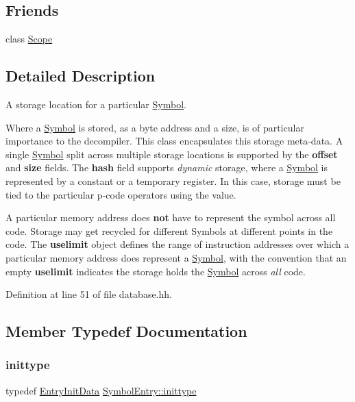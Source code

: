 \subsection*{Friends}
\begin{DoxyCompactItemize}
\item 
class \mbox{\hyperlink{class_symbol_entry_a921193447f6e42f596ac0a7694b02830}{Scope}}
\end{DoxyCompactItemize}


\subsection{Detailed Description}
A storage location for a particular \mbox{\hyperlink{class_symbol}{Symbol}}. 

Where a \mbox{\hyperlink{class_symbol}{Symbol}} is stored, as a byte address and a size, is of particular importance to the decompiler. This class encapsulates this storage meta-\/data. A single \mbox{\hyperlink{class_symbol}{Symbol}} split across multiple storage locations is supported by the {\bfseries{offset}} and {\bfseries{size}} fields. The {\bfseries{hash}} field supports {\itshape dynamic} storage, where a \mbox{\hyperlink{class_symbol}{Symbol}} is represented by a constant or a temporary register. In this case, storage must be tied to the particular p-\/code operators using the value.

A particular memory address does {\bfseries{not}} have to represent the symbol across all code. Storage may get recycled for different Symbols at different points in the code. The {\bfseries{uselimit}} object defines the range of instruction addresses over which a particular memory address does represent a \mbox{\hyperlink{class_symbol}{Symbol}}, with the convention that an empty {\bfseries{uselimit}} indicates the storage holds the \mbox{\hyperlink{class_symbol}{Symbol}} across {\itshape all} code. 

Definition at line 51 of file database.\+hh.



\subsection{Member Typedef Documentation}
\mbox{\label{class_symbol_entry_adca9545cc0e46b574a9cf9fbb44cfca8}} 
\subsubsection{\texorpdfstring{inittype}{inittype}}
{\footnotesize\ttfamily typedef \mbox{\hyperlink{class_symbol_entry_1_1_entry_init_data}{Entry\+Init\+Data}} \mbox{\hyperlink{class_symbol_entry_adca9545cc0e46b574a9cf9fbb44cfca8}{Symbol\+Entry\+::inittype}}}



